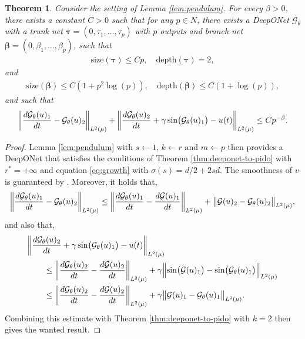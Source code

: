 \documentclass{article}
\numberwithin{equation}{section}
\newcommand{\size}{\mathrm{size}}
\newcommand{\depth}{\mathrm{depth}}
\newcommand{\cG}{\mathcal{G}}
\renewcommand{\tr}{{{\tau}}}
\newcommand{\trunk}{{\bm{\tau}}}
\newcommand{\branch}{{\bm{\beta}}}
\newcommand{\1}{\mathbbm{1}}
\newtheorem{theorem}{Theorem}[section]
\begin{document}
\begin{theorem}
Consider the setting of Lemma \ref{lem:pendulum}. For every $\beta>0$, there exists a constant $C>0$ such that for any $p\in N$, there exists a DeepONet $\cG_\theta$ with a trunk net $\trunk = (0,\tr_1, \dots, \tr_p)$ with $p$ outputs and branch net $\branch = (0,\beta_1,\dots, \beta_p)$, such that 
\begin{gather}
\size(\trunk) \le Cp,
\quad
\depth(\trunk) = 2,
\end{gather}
and
\begin{gather}
\size(\branch) \le C(1+p^2 \log(p)), 
\quad
\depth(\branch) \le C(1+ \log(p)),
\end{gather}
and such that
\begin{equation}
    \norm{\frac{d\cG_\theta(u)_1}{dt} - \cG_\theta(u)_2}_{L^2(\mu)} + \norm{\frac{d\cG_\theta(u)_2}{dt} + \gamma\sin(\cG_\theta(u)_1) - u(t)}_{L^2(\mu)} \leq Cp^{-\beta}.
\end{equation}
\end{theorem}

\begin{proof}
Lemma \ref{lem:pendulum} with $s\leftarrow1$, $k\leftarrow r$ and $m\leftarrow p$ then provides a DeepONet that satisfies the conditions of Theorem \ref{thm:deeponet-to-pido} with $r^*=+\infty$ and equation \eqref{eq:growth} with $\sigma(s)=d/2+2sd$. The smoothness of $v$ is guaranteed by \cite[Lemma 4.3]{LMK1}. Moreover, it holds that, 
\begin{equation}
     \norm{\frac{d\cG_\theta(u)_1}{dt} - \cG_\theta(u)_2}_{L^2(\mu)} \leq \norm{\frac{d\cG_\theta(u)_1}{dt} - \frac{d\cG(u)_1}{dt}}_{L^2(\mu)} + \norm{\cG(u)_2 - \cG_\theta(u)_2}_{L^2(\mu)},
\end{equation}
and also that,
\begin{align}
\begin{split}
&\norm{\frac{d\cG_\theta(u)_2}{dt} + \gamma\sin(\cG_\theta(u)_1) - u(t)}_{L^2(\mu)} \\
     &\qquad\leq \norm{\frac{d\cG_\theta(u)_2}{dt} - \frac{d\cG(u)_2}{dt}}_{L^2(\mu)}+ \gamma\norm{\sin(\cG(u)_1)-\sin(\cG_\theta(u)_1) }_{L^2(\mu)}\\
     &\qquad\leq \norm{\frac{d\cG_\theta(u)_2}{dt} - \frac{d\cG(u)_2}{dt}}_{L^2(\mu)}+ \gamma\norm{\cG(u)_1-\cG_\theta(u)_1 }_{L^2(\mu)}.
\end{split}
\end{align}
Combining this estimate with Theorem \ref{thm:deeponet-to-pido} with $k=2$ then gives the wanted result. 
\end{proof}
\end{document}

